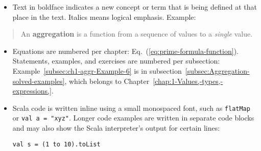 \begin{itemize}
\item Text in boldface indicates a new concept or term that is being defined
at that place in the text. Italics means logical emphasis. Example:
\end{itemize}
\begin{quotation}
An \textbf{aggregation} is a function from a sequence
of values to a \emph{single} value.
\end{quotation}
\begin{itemize}
\item Equations are numbered per chapter: Eq.~(\ref{eq:prime-formula-function}).
Statements, examples, and exercises are numbered per subsection: Example~\ref{subsec:ch1-aggr-Example-6}
is in subsection~\ref{subsec:Aggregation-solved-examples}, which
belongs to Chapter~\ref{chap:1-Values,-types,-expressions,}.
\item Scala code is written inline using a small monospaced font, such as
\lstinline!flatMap! or \lstinline!val a = "xyz"!. Longer code examples
are written in separate code blocks and may also show the Scala interpreter\textsf{'}s
output for certain lines:
\begin{lstlisting}[mathescape=true]
val s = (1 to 10).toList


\end{lstlisting}
\end{itemize}
